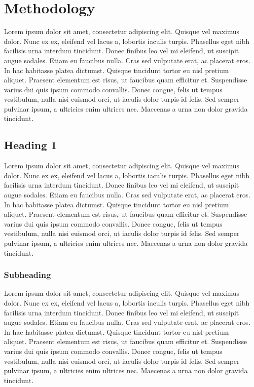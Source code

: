 \chapter{Methodology}
\label{chp:b3}

	Lorem ipsum dolor sit amet, consectetur adipiscing elit. Quisque vel maximus dolor. Nunc ex ex, eleifend vel lacus a, lobortis iaculis turpis. Phasellus eget nibh facilisis urna interdum tincidunt. Donec finibus leo vel mi eleifend, ut suscipit augue sodales. Etiam eu faucibus nulla. Cras sed vulputate erat, ac placerat eros. In hac habitasse platea dictumst. Quisque tincidunt tortor eu nisl pretium aliquet. Praesent elementum est risus, ut faucibus quam efficitur et. Suspendisse varius dui quis ipsum commodo convallis. Donec congue, felis ut tempus vestibulum, nulla nisi euismod orci, ut iaculis dolor turpis id felis. Sed semper pulvinar ipsum, a ultricies enim ultrices nec. Maecenas a urna non dolor gravida tincidunt.

\section{Heading 1}
Lorem ipsum dolor sit amet, consectetur adipiscing elit. Quisque vel maximus dolor. Nunc ex ex, eleifend vel lacus a, lobortis iaculis turpis. Phasellus eget nibh facilisis urna interdum tincidunt. Donec finibus leo vel mi eleifend, ut suscipit augue sodales. Etiam eu faucibus nulla. Cras sed vulputate erat, ac placerat eros. In hac habitasse platea dictumst. Quisque tincidunt tortor eu nisl pretium aliquet. Praesent elementum est risus, ut faucibus quam efficitur et. Suspendisse varius dui quis ipsum commodo convallis. Donec congue, felis ut tempus vestibulum, nulla nisi euismod orci, ut iaculis dolor turpis id felis. Sed semper pulvinar ipsum, a ultricies enim ultrices nec. Maecenas a urna non dolor gravida tincidunt.

	\subsection{Subheading}
	\label{subsec:subheading}
	Lorem ipsum dolor sit amet, consectetur adipiscing elit. Quisque vel maximus dolor. Nunc ex ex, eleifend vel lacus a, lobortis iaculis turpis. Phasellus eget nibh facilisis urna interdum tincidunt. Donec finibus leo vel mi eleifend, ut suscipit augue sodales. Etiam eu faucibus nulla. Cras sed vulputate erat, ac placerat eros. In hac habitasse platea dictumst. Quisque tincidunt tortor eu nisl pretium aliquet. Praesent elementum est risus, ut faucibus quam efficitur et. Suspendisse varius dui quis ipsum commodo convallis. Donec congue, felis ut tempus vestibulum, nulla nisi euismod orci, ut iaculis dolor turpis id felis. Sed semper pulvinar ipsum, a ultricies enim ultrices nec. Maecenas a urna non dolor gravida tincidunt.

